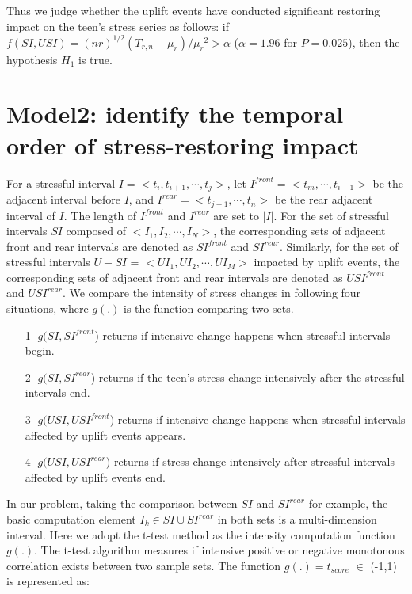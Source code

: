 Thus we judge whether the uplift events have conducted significant restoring impact on the teen's stress series as follows:
if $f(SI,USI)=(nr)^{1/2}(T_{r,n}-\mu_{r})/{\mu_r}^2>\alpha$ ($\alpha = 1.96$ for $P=0.025$),
then the hypothesis $H_1$ is true.

\section{Model2: identify the temporal order of stress-restoring impact}
\label{mod:mod2}
For a stressful interval $I = <t_i,t_{i+1},\cdots,t_j>$,
let $I^{front} = <t_m,\cdots,t_{i-1}>$ be the adjacent interval before $I$,
and $I^{rear} = <t_{j+1},\cdots,t_n>$ be the rear adjacent interval of $I$.
The length of $I^{front}$ and $I^{rear}$ are set to $|I|$.
For the set of stressful intervals $SI$ composed of $<I_1,I_2,\cdots,I_N>$,
the corresponding sets of adjacent front and rear intervals are denoted as $SI^{front}$ and $SI^{rear}$.
Similarly, for the set of stressful intervals $U-SI$ = $<UI_1,UI_2,\cdots, UI_M>$ impacted by uplift events,
the corresponding sets of adjacent front and rear intervals are denoted as $USI^{front}$ and $USI^{rear}$.
We compare the intensity of stress changes in following four situations,
where $g(.)$ is the function comparing two sets.

\begin{itemize}
\item[\textcircled{1}] $g(SI,SI^{front}$) returns if intensive change happens when stressful intervals begin.
\item[\textcircled{2}] $g(SI,SI^{rear}$) returns if the teen's stress change intensively after the stressful intervals end.
\item[\textcircled{3}] $g(USI,USI^{front}$) returns if intensive change happens when stressful intervals affected by uplift events appears.
\item[\textcircled{4}] $g(USI,USI^{rear}$) returns if stress change intensively after stressful intervals affected by uplift events end.
\end{itemize}

In our problem, taking the comparison between $SI$ and $SI^{rear}$ for example,
the basic computation element $I_k \in SI \cup SI^{rear}$ in both sets is a multi-dimension interval.
Here we adopt the t-test method as the intensity computation function $g(.)$.
The t-test algorithm measures if intensive positive or negative monotonous correlation
exists between two sample sets.
The function $g(.) = t_{score}$ $\in$ (-1,1) is represented as:

